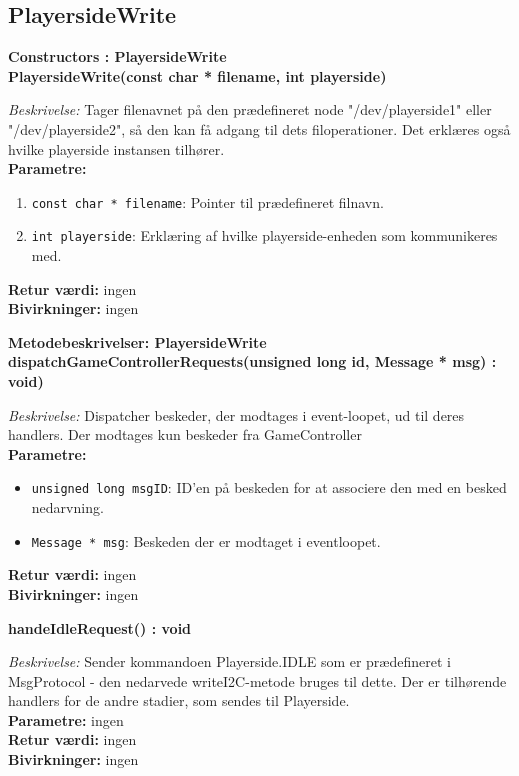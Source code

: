 \documentclass[Softwaredesign/Softwaredesign_main.tex]{subfiles}
\begin{document}
\subsection{PlayersideWrite}
{\large\textbf{Constructors : PlayersideWrite}}\\[0.2cm]
\textbf{PlayersideWrite(const char * filename, int playerside)}
\begin{adjustwidth}{1cm}{0pt}
\textit{Beskrivelse:} Tager filenavnet på den prædefineret node "/dev/playerside1" eller "/dev/playerside2", så den kan få adgang til dets filoperationer. Det erklæres også hvilke playerside instansen tilhører. \\[0.2cm]
\textbf{Parametre:}
\begin{enumerate}
    \item \lstinline{const char * filename}: Pointer til prædefineret filnavn. 
    \item \lstinline{int playerside}: Erklæring af hvilke playerside-enheden som kommunikeres med. 
\end{enumerate}
\textbf{Retur værdi:} ingen \\[0.2cm]
\textbf{Bivirkninger:} ingen \\[0.2cm]
\end{adjustwidth}

{\large\textbf{Metodebeskrivelser: PlayersideWrite}}\\[0.2cm]
\textbf{dispatchGameControllerRequests(unsigned long id, Message * msg) : void)}
\begin{adjustwidth}{1cm}{0pt}
\textit{Beskrivelse:} Dispatcher beskeder, der modtages i event-loopet, ud til deres handlers. Der modtages kun beskeder fra GameController\\[0.2cm]
\textbf{Parametre:}
\begin{itemize}
    \item \lstinline{unsigned long msgID}: ID'en på beskeden for at associere den med en besked nedarvning.
    \item \lstinline{Message * msg}: Beskeden der er modtaget i eventloopet.
\end{itemize}
\textbf{Retur værdi:} ingen \\[0.2cm]
\textbf{Bivirkninger:} ingen \\[0.2cm]
\end{adjustwidth}

\textbf{handeIdleRequest() : void}
\begin{adjustwidth}{1cm}{0pt}
\textit{Beskrivelse:} Sender kommandoen Playerside.IDLE som er prædefineret i MsgProtocol - den nedarvede writeI2C-metode bruges til dette. Der er tilhørende handlers for de andre stadier, som sendes til Playerside.\\[0.2cm]
\textbf{Parametre:} ingen \\[0.2cm]
\textbf{Retur værdi:} ingen \\[0.2cm]
\textbf{Bivirkninger:} ingen \\[0.2cm]
\end{adjustwidth}
\end{document}

